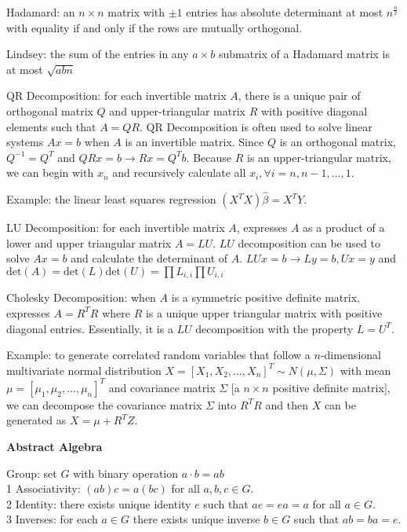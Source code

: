 Hadamard: an $n \times n$ matrix with $\pm 1$ entries has absolute determinant at most $n^{\frac{n}{2}}$ with equality if and only if the rows are mutually orthogonal.

Lindsey: the sum of the entries in any $a \times b$ submatrix of a Hadamard matrix is at most $\sqrt{abn}$

QR Decomposition: for each invertible matrix $A$, there is a unique pair of orthogonal matrix $Q$ and upper-triangular matrix $R$ with positive diagonal elements such that $A=QR$. QR Decomposition is often used to solve linear systems $Ax=b$ when $A$ is an invertible matrix. Since $Q$ is an orthogonal matrix, $Q^{-1}=Q^T$ and $QRx=b \to Rx=Q^T b$. Because $R$ is an upper-triangular matrix, we can begin with $x_n$ and recursively calculate all $x_i, \forall i=n,n-1,\dots,1$.

Example: the linear least squares regression $(X^T X)\hat{\beta}=X^T Y$.

LU Decomposition: for each invertible matrix $A$, expresses $A$ as a product of a lower and upper triangular matrix $A=LU$. $LU$ decomposition can be used to solve $Ax=b$ and calculate the determinant of $A$. $LUx=b \to Ly=b, Ux=y$ and $\text{det}(A)=\text{det}(L)\text{det}(U)=\prod L_{i,i}\prod U_{i,i}$

Cholesky Decomposition: when $A$ is a symmetric positive definite matrix, expresses $A=R^T R$ where $R$ is a unique upper triangular matrix with positive diagonal entries. Essentially, it is a $LU$ decomposition with the property $L=U^T$.

Example: to generate correlated random variables that follow a $n$-dimensional multivariate normal distribution $X=[X_1,X_2,\dots,X_n]^T \sim N(\mu,\Sigma)$ with mean $\mu=[\mu_1,\mu_2,\dots,\mu_n]^T$ and covariance matrix $\Sigma$ [a $n \times n$ positive definite matrix], we can decompose the covariance matrix $\Sigma$ into $R^T R$ and then $X$ can be generated as $X=\mu + R^T Z$.

\newpage

\textbf{Abstract Algebra}

Group: set $G$ with binary operation $a \cdot b=ab$ \\
1 Associativity: $(ab)c=a(bc)$ for all $a,b,c \in G$. \\
2 Identity: there exists unique identity $e$ such that $ae=ea=a$ for all $a \in G$. \\
3 Inverses: for each $a \in G$ there exists unique inverse $b \in G$ such that $ab=ba=e$.


